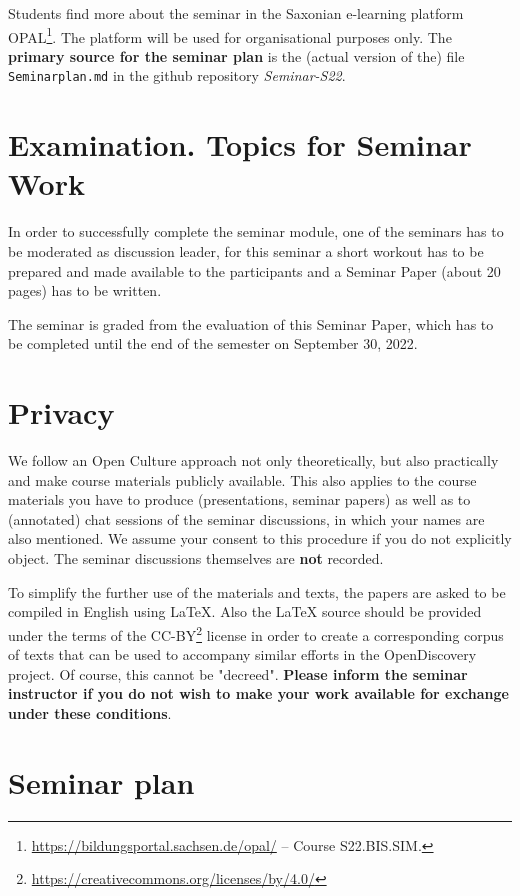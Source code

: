 \documentclass[11pt,a4paper]{article}
\begin{document}
Students find more about the seminar in the Saxonian e-learning platform
OPAL\footnote{\url{https://bildungsportal.sachsen.de/opal/} -- Course
  S22.BIS.SIM.}.  The platform will be used for organisational purposes only.
The \textbf{primary source for the seminar plan} is the (actual version of
the) file \texttt{Seminarplan.md} in the github repository \emph{Seminar-S22}.

\section{Examination. Topics for Seminar Work}

In order to successfully complete the seminar module, one of the seminars has
to be moderated as discussion leader, for this seminar a short workout has to
be prepared and made available to the participants and a Seminar Paper (about
20 pages) has to be written.

The seminar is graded from the evaluation of this Seminar Paper, which has to
be completed until the end of the semester on September 30, 2022.

\section{Privacy}

We follow an Open Culture approach not only theoretically, but also
practically and make course materials publicly available.  This also applies
to the course materials you have to produce (presentations, seminar papers) as
well as to (annotated) chat sessions of the seminar discussions, in which your
names are also mentioned.  We assume your consent to this procedure if you do
not explicitly object.  The seminar discussions themselves are \textbf{not}
recorded.

To simplify the further use of the materials and texts, the papers are asked
to be compiled in English using {\LaTeX}.  Also the {\LaTeX} source should be
provided under the terms of the
CC-BY\footnote{\url{https://creativecommons.org/licenses/by/4.0/}} license in
order to create a corresponding corpus of texts that can be used to accompany
similar efforts in the OpenDiscovery project. Of course, this cannot be
"decreed". \textbf{Please inform the seminar instructor if you do not wish to
  make your work available for exchange under these conditions}.

\section{Seminar plan}
\end{document}
